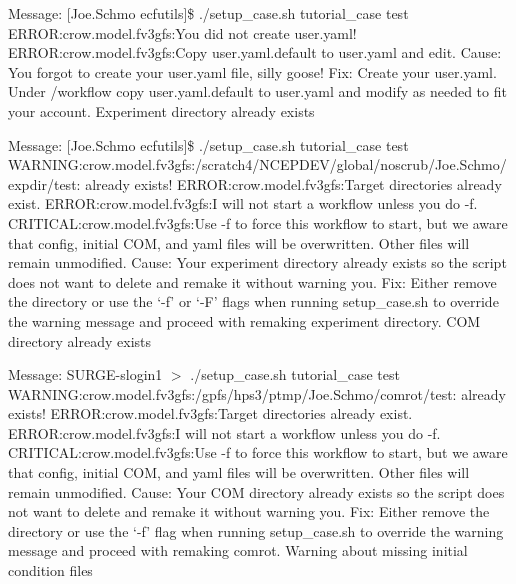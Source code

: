 Message\-: \mbox{[}Joe.\-Schmo ecfutils\mbox{]}\$ ./setup\-\_\-case.sh tutorial\-\_\-case test E\-R\-R\-O\-R\-:crow.\-model.\-fv3gfs\-:You did not create user.\-yaml! E\-R\-R\-O\-R\-:crow.\-model.\-fv3gfs\-:Copy user.\-yaml.\-default to user.\-yaml and edit. Cause\-: You forgot to create your user.\-yaml file, silly goose! Fix\-: Create your user.\-yaml. Under /workflow copy user.\-yaml.\-default to user.\-yaml and modify as needed to fit your account. Experiment directory already exists

Message\-: \mbox{[}Joe.\-Schmo ecfutils\mbox{]}\$ ./setup\-\_\-case.sh tutorial\-\_\-case test W\-A\-R\-N\-I\-N\-G\-:crow.\-model.\-fv3gfs\-:/scratch4/\-N\-C\-E\-P\-D\-E\-V/global/noscrub/\-Joe.Schmo/expdir/test\-: already exists! E\-R\-R\-O\-R\-:crow.\-model.\-fv3gfs\-:Target directories already exist. E\-R\-R\-O\-R\-:crow.\-model.\-fv3gfs\-:I will not start a workflow unless you do -\/f. C\-R\-I\-T\-I\-C\-A\-L\-:crow.\-model.\-fv3gfs\-:Use -\/f to force this workflow to start, but we aware that config, initial C\-O\-M, and yaml files will be overwritten. Other files will remain unmodified. Cause\-: Your experiment directory already exists so the script does not want to delete and remake it without warning you. Fix\-: Either remove the directory or use the ‘-\/f’ or ‘-\/\-F’ flags when running setup\-\_\-case.\-sh to override the warning message and proceed with remaking experiment directory. C\-O\-M directory already exists

Message\-: S\-U\-R\-G\-E-\/slogin1 $>$ ./setup\-\_\-case.sh tutorial\-\_\-case test W\-A\-R\-N\-I\-N\-G\-:crow.\-model.\-fv3gfs\-:/gpfs/hps3/ptmp/\-Joe.Schmo/comrot/test\-: already exists! E\-R\-R\-O\-R\-:crow.\-model.\-fv3gfs\-:Target directories already exist. E\-R\-R\-O\-R\-:crow.\-model.\-fv3gfs\-:I will not start a workflow unless you do -\/f. C\-R\-I\-T\-I\-C\-A\-L\-:crow.\-model.\-fv3gfs\-:Use -\/f to force this workflow to start, but we aware that config, initial C\-O\-M, and yaml files will be overwritten. Other files will remain unmodified. Cause\-: Your C\-O\-M directory already exists so the script does not want to delete and remake it without warning you. Fix\-: Either remove the directory or use the ‘-\/f’ flag when running setup\-\_\-case.\-sh to override the warning message and proceed with remaking comrot. Warning about missing initial condition files

